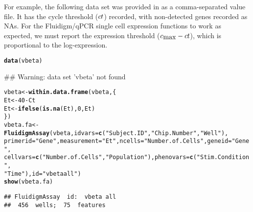 \documentclass{article}\usepackage{graphicx, color}
\makeatletter
\newcommand{\hlfunctioncall}[1]{\textcolor[rgb]{0.501960784313725,0,0.329411764705882}{\textbf{#1}}}%
\newcommand{\hlstring}[1]{\textcolor[rgb]{0.6,0.6,1}{#1}}%
\newenvironment{kframe}{%
 \def\at@end@of@kframe{}%
 \ifinner\ifhmode%
  \def\at@end@of@kframe{\end{minipage}}%
  \begin{minipage}{\columnwidth}%
 \fi\fi%
 \def\FrameCommand##1{\hskip\@totalleftmargin \hskip-\fboxsep
 \colorbox{shadecolor}{##1}\hskip-\fboxsep
     \hskip-\linewidth \hskip-\@totalleftmargin \hskip\columnwidth}%
 \MakeFramed {\advance\hsize-\width
   \@totalleftmargin\z@ \linewidth\hsize
   \@setminipage}}%
 {\par\unskip\endMakeFramed%
 \at@end@of@kframe}
\newenvironment{knitrout}{}{} %
\makeatother
\begin{document}
For example, the following data set was provided in as a comma-separated value file.
It has the cycle threshold ($c\mspace{-.5mu}t$) recorded, with non-detected genes recorded as NAs.
For the Fluidigm/qPCR single cell expression functions to work as expected, we must report the expression threshold ($c_{\mbox{max}} - c\mspace{-.5mu}t$), which is proportional to the log-expression.
\begin{knitrout}
\color{fgcolor}\begin{kframe}
\begin{alltt}
\hlfunctioncall{data}(vbeta)
\end{alltt}
\begin{flushleft}\ttfamily\noindent\textcolor{warningcolor}{\#\# Warning: data set 'vbeta' not found}\end{flushleft}\begin{alltt}
vbeta <- \hlfunctioncall{within.data.frame}(vbeta, \{
    Et <- 40 - Ct
    Et <- \hlfunctioncall{ifelse}(\hlfunctioncall{is.na}(Et), 0, Et)
\})
vbeta.fa <- \hlfunctioncall{FluidigmAssay}(vbeta, idvars = \hlfunctioncall{c}(\hlstring{"Subject.ID"}, \hlstring{"Chip.Number"}, \hlstring{"Well"}), 
    primerid = \hlstring{"Gene"}, measurement = \hlstring{"Et"}, ncells = \hlstring{"Number.of.Cells"}, geneid = \hlstring{"Gene"}, 
    cellvars = \hlfunctioncall{c}(\hlstring{"Number.of.Cells"}, \hlstring{"Population"}), phenovars = \hlfunctioncall{c}(\hlstring{"Stim.Condition"}, 
        \hlstring{"Time"}), id = \hlstring{"vbeta all"})
\hlfunctioncall{show}(vbeta.fa)
\end{alltt}
\begin{verbatim}
## FluidigmAssay  id:  vbeta all 
##  456  wells;  75  features
\end{verbatim}
\end{kframe}
\end{knitrout}
\end{document}
